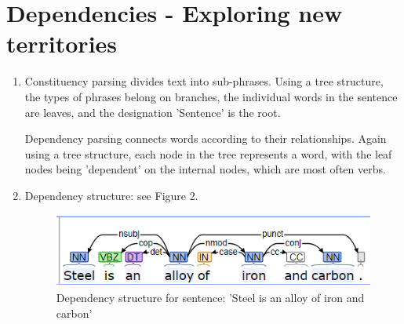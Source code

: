 \documentclass[12pt]{report}
\begin{document}
\section{Dependencies - Exploring new territories}
\begin{enumerate}
  \item Constituency parsing divides text into sub-phrases. Using a tree
  structure, the types of phrases belong on branches, the individual words in
  the sentence are leaves, and the designation 'Sentence' is the root.\par

  \noindent Dependency parsing connects words according to their relationships.
  Again using a tree structure, each node in the tree represents a word, with
  the leaf nodes being 'dependent' on the internal nodes, which are most often
  verbs.
  \item Dependency structure: see Figure 2.
  \begin{figure}[h]
    \includegraphics[width=\linewidth]{task3dep.PNG}
    \caption{Dependency structure for sentence: 'Steel is an alloy of iron and
    carbon'}
    \label{DepStruct}
  \end{figure}
\end{enumerate}
\end{document}
